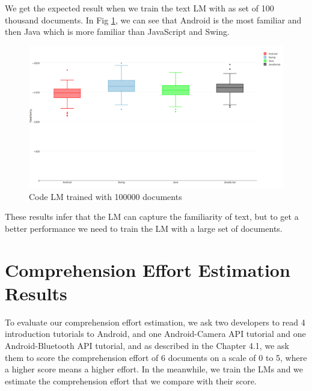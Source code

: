\documentclass[12pt,mscthesis]{usiinfthesis}
\begin{document}
{We get the expected result when we train the text LM with as set of 100 thousand documents. In Fig \ref{text100000}, we can see that Android is the most familiar and then Java which is more familiar than JavaScript and Swing.
\begin{figure}[H]
			\centering
			\includegraphics[width=\textwidth]{text100000}
			\caption{Code LM trained with 100000 documents}
			\label{text100000}
\end{figure}
These results infer that the LM can capture the familiarity of text, but to get a better performance we need to train the LM with a large set of documents.

\section{Comprehension Effort Estimation Results}

To evaluate our comprehension effort estimation, we ask two developers to read 4 introduction tutorials to Android, and one Android-Camera API tutorial and one Android-Bluetooth API tutorial, and as described in the Chapter 4.1, we ask them to score the comprehension effort of 6 documents on a scale of 0 to 5, where a higher score means a higher effort. In the meanwhile, we train the LMs and we estimate the comprehension effort that we compare with their score. 



}
\end{document}
